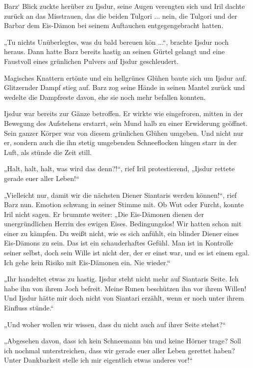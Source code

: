 Barz‘ Blick zuckte herüber zu Ijsdur, seine Augen verengten sich und Iril dachte zurück an das Misstrauen, das die beiden Tulgori ... nein, die Tulgori und der Barbar dem Eis-Dämon bei seinem Auftauchen entgegengebracht hatten.

„Tu nichts Unüberlegtes, was du bald bereuen kön ...“, brachte Ijsdur noch heraus. Dann hatte Barz bereits hastig an seinen Gürtel gelangt und eine Faustvoll eines grünlichen Pulvers auf Ijsdur geschleudert.

Magisches Knattern ertönte und ein hellgrünes Glühen baute sich um Ijsdur auf. Glitzernder Dampf stieg auf. Barz zog seine Hände in seinen Mantel zurück und wedelte die Dampfreste davon, ehe sie noch mehr befallen konnten.

Ijsdur war bereits zur Gänze betroffen. Er wirkte wie eingefroren, mitten in der Bewegung des Aufstehens erstarrt, sein Mund halb zu einer Erwiderung geöffnet. Sein ganzer Körper war von diesem grünlichen Glühen umgeben. Und nicht nur er, sondern auch die ihn stetig umgebenden Schneeflocken hingen starr in der Luft, als stünde die Zeit still.

„Halt, halt, halt, was wird das denn?!“, rief Iril protestierend, „Ijsdur rettete gerade euer aller Leben!“

„Vielleicht nur, damit wir die nächsten Diener Siantaris werden können!“, rief Barz nun. Emotion schwang in seiner Stimme mit. Ob Wut oder Furcht, konnte Iril nicht sagen. Er brummte weiter: „Die Eis-Dämonen dienen der unergründlichen Herrin des ewigen Eises. Bedingungslos! Wir hatten schon mit einer zu kämpfen. Du weißt nicht, wie es sich anfühlt, ein blinder Diener eines Eis-Dämons zu sein. Das ist ein schauderhaftes Gefühl. Man ist in Kontrolle seiner selbst, doch sein Wille ist nicht der, der er einst war, und es ist einem egal. Ich gehe kein Risiko mit Eis-Dämonen ein. Nie wieder.“

„Ihr handeltet etwas zu hastig. Ijsdur steht nicht mehr auf Siantaris Seite. Ich habe ihn von ihrem Joch befreit. Meine Runen beschützen ihn vor ihrem Willen! Und Ijsdur hätte mir doch nicht von Siantari erzählt, wenn er noch unter ihrem Einfluss stünde.“

„Und woher wollen wir wissen, dass du nicht auch auf ihrer Seite stehst?“

„Abgesehen davon, dass ich kein Schneemann bin und keine Hörner trage? Soll ich nochmal unterstreichen, dass wir gerade euer aller Leben gerettet haben? Unter Dankbarkeit stelle ich mir eigentlich etwas anderes vor!“

